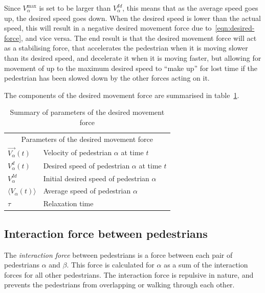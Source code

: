 Since $V^{\text{max}}_\alpha$ is set to be larger than $V^{Id}_\alpha$, this 
means that as the average speed goes up, the desired speed goes down.  When 
the desired speed is lower than the actual speed, this will result in a 
negative desired movement force due to~\eqref{eqn:desired-force}, and vice 
versa. The end result is that the desired movement force will act as a 
stabilising force, that accelerates the pedestrian when it is moving slower 
than its desired speed, and decelerate it when it is moving faster, but 
allowing for movement of up to the maximum desired speed to ``make up'' for 
lost time if the pedestrian has been slowed down by the other forces acting on 
it.

The components of the desired movement force are summarised in 
table~\ref{tbl:desired-force}.

\begin{table}[h]
    \centering
    \begin{tabular}{l l}
        \toprule
        \multicolumn{2}{c}{\textsf{Parameters of the desired movement force}}\\
        $\overrightarrow{V_{\alpha}}(t)$ & Velocity of pedestrian $\alpha$ 
        at time $t$\\
        $V_{\alpha}^{d}(t)$ & Desired speed of pedestrian $\alpha$ at time 
        $t$\\
        $V_{\alpha}^{Id}$ & Initial desired speed of pedestrian $\alpha$ \\
        $\langle V_{\alpha}(t) \rangle$ & Average speed of pedestrian 
        $\alpha$ \\
        $\tau$& Relaxation time \\
        \bottomrule
    \end{tabular}
    \caption{Summary of parameters of the desired movement force}
    \label{tbl:desired-force}
\end{table}

\subsection{Interaction force between pedestrians}
\label{seq:interaction-pedestrians}
The \emph{interaction force} between pedestrians is a force between each pair 
of pedestrians $\alpha$ and $\beta$. This force is calculated for $\alpha$ as 
a sum of the interaction forces for all other pedestrians. The interaction 
force is repulsive in nature, and prevents the pedestrians from overlapping or 
walking through each other.

